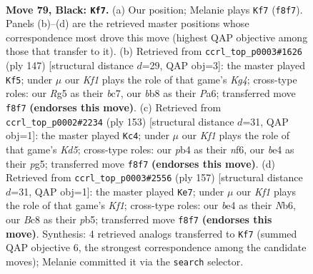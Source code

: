 \documentclass[11pt]{article}
\begin{document}
\clearpage

\begin{figure}[p]\centering
\begin{subfigure}{0.46\textwidth}\centering
\resizebox{\linewidth}{!}{%
\newchessgame
\chessboard[
  setfen={1Bb2k2/8/8/6r1/PP2B3/2K4p/1R6/5N2 b - - 16 79},
  showmover=false,
  pgfstyle=straightmove, color=movearrow, markmove={f8-f7}
]}
\caption{}
\end{subfigure}\hfill
\begin{subfigure}{0.46\textwidth}\centering
\resizebox{\linewidth}{!}{%
\newchessgame
\chessboard[
  setfen={8/2B5/p7/2K3k1/P2R4/7r/4b3/8 b - - 4 74},
  showmover=false,
  pgfstyle=straightmove, color=movearrow, markmove={g5-f5}
]}
\caption{}
\end{subfigure}
\\[4pt]
\begin{subfigure}{0.46\textwidth}\centering
\resizebox{\linewidth}{!}{%
\newchessgame
\chessboard[
  setfen={8/8/1b3N2/6P1/3k1K2/p6r/4RP2/8 b - - 0 77},
  showmover=false,
  pgfstyle=straightmove, color=movearrow, markmove={d4-c4}
]}
\caption{}
\end{subfigure}\hfill
\begin{subfigure}{0.46\textwidth}\centering
\resizebox{\linewidth}{!}{%
\newchessgame
\chessboard[
  setfen={5k2/8/1n6/1P3Bp1/3r4/1R4KP/8/8 b - - 7 79},
  showmover=false,
  pgfstyle=straightmove, color=movearrow, markmove={f8-e7}
]}
\caption{}
\end{subfigure}
\caption{\textbf{Move 79, Black: \texttt{Kf7}.} (a) Our position; Melanie plays \texttt{Kf7} (\texttt{f8f7}). Panels (b)--(d) are the retrieved master positions whose correspondence most drove this move (highest QAP objective among those that transfer to it). (b) Retrieved from \texttt{ccrl\_top\_p0003\#1626} (ply 147) [structural distance $d$=29, QAP obj=3]: the master played \texttt{Kf5}; under $\mu$ our \emph{Kf1} plays the role of that game's \emph{Kg4}; cross-type roles: our \emph{R}g5 as their \emph{b}c7, our \emph{b}b8 as their \emph{P}a6; transferred move \texttt{f8f7} \textbf{(endorses this move)}. (c) Retrieved from \texttt{ccrl\_top\_p0002\#2234} (ply 153) [structural distance $d$=31, QAP obj=1]: the master played \texttt{Kc4}; under $\mu$ our \emph{Kf1} plays the role of that game's \emph{Kd5}; cross-type roles: our \emph{p}b4 as their \emph{n}f6, our \emph{b}e4 as their \emph{p}g5; transferred move \texttt{f8f7} \textbf{(endorses this move)}. (d) Retrieved from \texttt{ccrl\_top\_p0003\#2556} (ply 157) [structural distance $d$=31, QAP obj=1]: the master played \texttt{Ke7}; under $\mu$ our \emph{Kf1} plays the role of that game's \emph{Kf1}; cross-type roles: our \emph{b}e4 as their \emph{N}b6, our \emph{B}c8 as their \emph{p}b5; transferred move \texttt{f8f7} \textbf{(endorses this move)}. Synthesis: 4 retrieved analogs transferred to \texttt{Kf7} (summed QAP objective 6, the strongest correspondence among the candidate moves); Melanie committed it via the \texttt{search} selector.}
\label{fig:thought-m157}
\end{figure}
\end{document}
